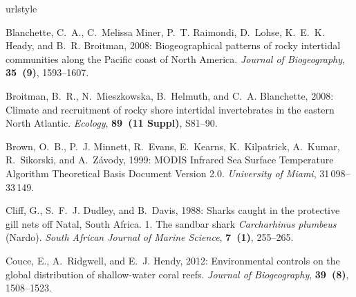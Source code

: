 \documentclass{ametsoc}
\begin{document}
\begin{thebibliography}{23}
\providecommand{\natexlab}[1]{#1}
\providecommand{\url}[1]{\texttt{#1}}
\renewcommand{\UrlFont}{\rmfamily}
\providecommand{\urlprefix}{URL }
\expandafter\ifx\csname urlstyle\endcsname\relax
  \providecommand{\doi}[1]{doi:\discretionary{}{}{}#1}\else
  \providecommand{\doi}{doi:\discretionary{}{}{}\begingroup
  \urlstyle{rm}\Url}\fi
\providecommand{\eprint}[2][]{\url{#2}}

Blanchette, C.~A., C.~{Melissa Miner}, P.~T. Raimondi, D.~Lohse, K.~E.~K.
  Heady, and B.~R. Broitman, 2008: {Biogeographical patterns of rocky
  intertidal communities along the Pacific coast of North America}.
  \textit{Journal of Biogeography}, \textbf{35~(9)}, 1593--1607.

Broitman, B.~R., N.~Mieszkowska, B.~Helmuth, and C.~A. Blanchette, 2008:
  {Climate and recruitment of rocky shore intertidal invertebrates in the
  eastern North Atlantic.} \textit{Ecology}, \textbf{89~(11 Suppl)}, S81--90.

Brown, O.~B., P.~J. Minnett, R.~Evans, E.~Kearns, K.~Kilpatrick, A.~Kumar,
  R.~Sikorski, and A.~Z{\'{a}}vody, 1999: {MODIS Infrared Sea Surface
  Temperature Algorithm Theoretical Basis Document Version 2.0}.
  \textit{University of Miami}, 31\,098--33\,149.


Cliff, G., S.~F.~J. Dudley, and B.~Davis, 1988: {Sharks caught in the
  protective gill nets off Natal, South Africa. 1. The sandbar shark
  \textit{Carcharhinus plumbeus} (Nardo)}. \textit{South African Journal of Marine
  Science}, \textbf{7~(1)}, 255--265.

Couce, E., A.~Ridgwell, and E.~J. Hendy, 2012: {Environmental controls on the
  global distribution of shallow-water coral reefs}. \textit{Journal of
  Biogeography}, \textbf{39~(8)}, 1508--1523.


\end{thebibliography}
\end{document}
